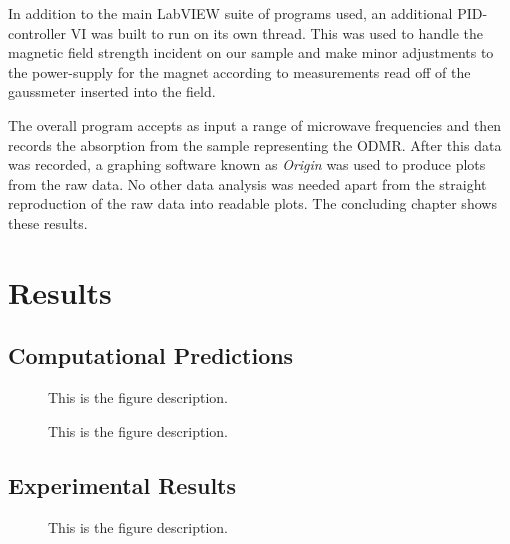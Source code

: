 \documentclass[oneside, astronomy, noacknowlegments]{BYUPhys}
\begin{document}
In addition to the main LabVIEW suite of programs used, an additional PID-controller VI was built to run on its own thread. This was used to handle the magnetic field strength incident on our sample and make minor adjustments to the power-supply for the magnet according to measurements read off of the gaussmeter inserted into the field.

The overall program accepts as input a range of microwave frequencies and then records the absorption from the sample representing the ODMR. After this data was recorded, a graphing software known as \textit{Origin} was used to produce plots from the raw data. No other data analysis was needed apart from the straight reproduction of the raw data into readable plots. The concluding chapter shows these results.










\chapter{Results}

\section{Computational Predictions}

\begin{figure}
    \caption[ODMR computational model for SiC]{\label{fig:SiCModel}
     This is the figure description.}
 \end{figure}

\begin{figure}
    \caption[ODMR computational model for CdTe]{\label{fig:CdTeModel}
     This is the figure description.}
 \end{figure}

\section{Experimental Results}

\begin{figure}
    \caption[Experimental ODMR for SiC]{\label{fig:SiCResults}
     This is the figure description.}
 \end{figure}
\end{document}
